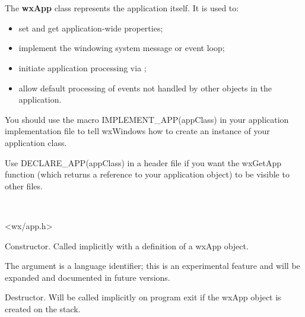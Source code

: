 \section{}\label{wxapp}

The {\bf wxApp} class represents the application itself. It is used
to:

\begin{itemize}\itemsep=0pt
\item set and get application-wide properties;
\item implement the windowing system message or event loop;
\item initiate application processing via ;
\item allow default processing of events not handled by other
objects in the application.
\end{itemize}

You should use the macro IMPLEMENT\_APP(appClass) in your application implementation
file to tell wxWindows how to create an instance of your application class.

Use DECLARE\_APP(appClass) in a header file if you want the wxGetApp function (which returns
a reference to your application object) to be visible to other files.


\\


<wx/app.h>






Constructor. Called implicitly with a definition of a wxApp object.

The argument is a language identifier; this is an experimental
feature and will be expanded and documented in future versions.



Destructor. Will be called implicitly on program exit if the wxApp
object is created on the stack.


